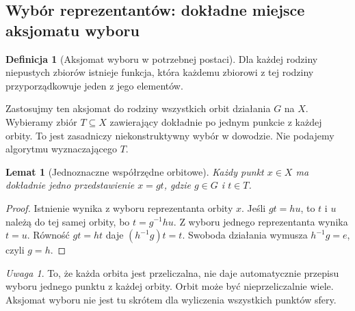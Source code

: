 \documentclass[11pt,a4paper]{article}
\numberwithin{equation}{section}
\theoremstyle{plain}
\newtheorem{lemat}[twierdzenie]{Lemat}
\theoremstyle{definition}
\newtheorem{definicja}[twierdzenie]{Definicja}
\theoremstyle{remark}
\newtheorem{uwaga}[twierdzenie]{Uwaga}
\begin{document}
\subsection{Wybór reprezentantów: dokładne miejsce aksjomatu wyboru}
\begin{definicja}[Aksjomat wyboru w potrzebnej postaci]
Dla każdej rodziny niepustych zbiorów istnieje funkcja, która każdemu zbiorowi z tej rodziny przyporządkowuje jeden z jego elementów.
\end{definicja}
Zastosujmy ten aksjomat do rodziny wszystkich orbit działania $G$ na $X$. Wybieramy zbiór $T\subseteq X$ zawierający dokładnie po jednym punkcie z każdej orbity. To jest zasadniczy niekonstruktywny wybór w dowodzie. Nie podajemy algorytmu wyznaczającego $T$.
\begin{lemat}[Jednoznaczne współrzędne orbitowe]\label{lem:wspolrzedne-orbitowe}
Każdy punkt $x\in X$ ma dokładnie jedno przedstawienie $x=gt$, gdzie $g\in G$ i $t\in T$.
\end{lemat}
\begin{proof}
Istnienie wynika z wyboru reprezentanta orbity $x$. Jeśli $gt=hu$, to $t$ i $u$ należą do tej samej orbity, bo $t=g^{-1}hu$. Z wyboru jednego reprezentanta wynika $t=u$. Równość $gt=ht$ daje $(h^{-1}g)t=t$. Swoboda działania wymusza $h^{-1}g=e$, czyli $g=h$.
\end{proof}
\begin{uwaga}
To, że każda orbita jest przeliczalna, nie daje automatycznie przepisu wyboru jednego punktu z każdej orbity. Orbit może być nieprzeliczalnie wiele. Aksjomat wyboru nie jest tu skrótem dla wyliczenia wszystkich punktów sfery.
\end{uwaga}
\end{document}
